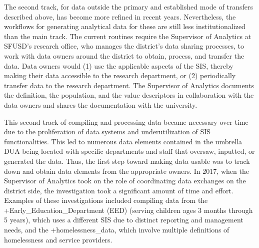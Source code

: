 \documentclass[
]{book}
\begin{document}
The second track, for data outside the primary and established mode of transfers described above, has become more refined in recent years. Nevertheless, the workflows for generating analytical data for these are still less institutionalized than the main track. The current routines require the Supervisor of Analytics at SFUSD's research office, who manages the district's data sharing processes, to work with data owners around the district to obtain, process, and transfer the data. Data owners would (1) use the applicable aspects of the SIS, thereby making their data accessible to the research department, or (2) periodically transfer data to the research department. The Supervisor of Analytics documents the definition, the population, and the value descriptors in collaboration with the data owners and shares the documentation with the university.

This second track of compiling and processing data became necessary over time due to the proliferation of data systems and underutilization of SIS functionalities. This led to numerous data elements contained in the umbrella DUA being located with specific departments and staff that oversaw, inputted, or generated the data. Thus, the first step toward making data usable was to track down and obtain data elements from the appropriate owners. In 2017, when the Supervisor of Analytics took on the role of coordinating data exchanges on the district side, the investigation took a significant amount of time and effort. Examples of these investigations included compiling data from the +Early\_Education\_Department\textbar{} (EED) (serving children ages 3 months through 5 years), which uses a different SIS due to distinct reporting and management needs, and the +homelessness\_data\textbar, which involve multiple definitions of homelessness and service providers.
\end{document}
